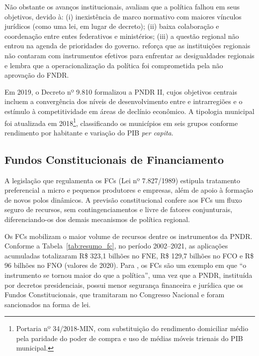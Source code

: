 Não obstante os avanços institucionais,  avaliam que a política falhou em seus objetivos, devido à: (i) inexistência de marco normativo com maiores vínculos jurídicos (como uma lei, em lugar de decreto); (ii) baixa colaboração e coordenação entre entes federativos e ministérios; (iii) a questão regional não entrou na agenda de prioridades do governo.  reforça que as instituições regionais não contaram com instrumentos efetivos para enfrentar as desigualdades regionais e lembra que a operacionalização da política foi comprometida pela não aprovação do FNDR.

Em 2019, o Decreto nº 9.810 formalizou a PNDR II, cujos objetivos centrais incluem a convergência dos níveis de desenvolvimento entre e intrarregiões e o estímulo à competitividade em áreas de declínio econômico. A tipologia municipal foi atualizada em 2018\footnote{Portaria nº 34/2018-MIN, com substituição do rendimento domiciliar médio pela paridade do poder de compra e uso de médias móveis trienais do PIB municipal.}, classificando os municípios em seis grupos conforme rendimento por habitante e variação do PIB \textit{per capita}.

\subsection{Fundos Constitucionais de Financiamento}
\label{subsec:fcs}

A legislação que regulamenta os FCs (Lei nº 7.827/1989) estipula tratamento preferencial a micro e pequenos produtores e empresas, além de apoio à formação de novos polos dinâmicos. A previsão constitucional confere aos FCs um fluxo seguro de recursos, sem contingenciamentos e livre de fatores conjunturais, diferenciando-os dos demais mecanismos de política regional.

Os FCs mobilizam o maior volume de recursos dentre os instrumentos da PNDR. Conforme a Tabela~\ref{tab:resumo_fc}, no período 2002--2021, as aplicações acumuladas totalizaram R\$ 323,1 bilhões no FNE, R\$ 129,7 bilhões no FCO e R\$ 96 bilhões no FNO (valores de 2020). Para , os FCs são um exemplo em que ``o instrumento se tornou maior do que a política'', uma vez que a PNDR, instituída por decretos presidenciais, possui menor segurança financeira e jurídica que os Fundos Constitucionais, que tramitaram no Congresso Nacional e foram sancionados na forma de lei.



